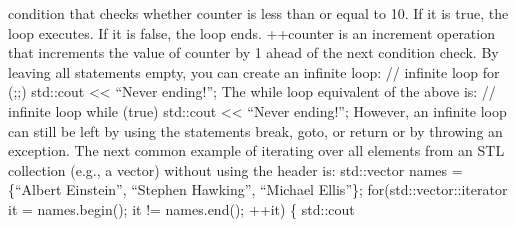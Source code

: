 condition that checks whether counter is less than or equal to 10. If it
is true, the loop executes. If it is false, the loop ends. ++counter is
an increment operation that increments the value of counter by 1 ahead
of the next condition check. By leaving all statements empty, you can
create an inﬁnite loop: // infinite loop for (;;) std::cout
\textless\textless{} ``Never ending!\n''; The while loop equivalent of
the above is: // infinite loop while (true) std::cout
\textless\textless{} ``Never ending!\n''; However, an inﬁnite loop can
still be left by using the statements break, goto, or return or by
throwing an exception. The next common example of iterating over all
elements from an STL collection (e.g., a vector) without using the
header is: std::vector names = \{``Albert Einstein'', ``Stephen
Hawking'', ``Michael Ellis''\}; for(std::vector::iterator it =
names.begin(); it != names.end(); ++it) \{ std::cout
